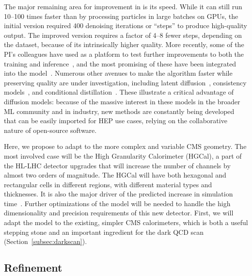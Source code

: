 The major remaining area for improvement in \diffu is its speed.
While it can still run 10--100 times faster than \GEANTfour by processing particles in large batches on GPUs,
the initial version required 400 denoising iterations or ``steps'' to produce high-quality output.
The improved version requires a factor of 4--8 fewer steps, depending on the dataset, because of its intrinsically higher quality.
More recently, some of the PI's colleagues have used \diffu as a platform to test further improvements to both the training and inference~\cite{Jiang:2024ohg},
and the most promising of these have been integrated into the model~\cite{Amram:GitHub}.
Numerous other avenues to make the algorithm faster while preserving quality are under investigation,
including latent diffusion~\cite{Rombach:2022}, consistency models~\cite{Song:2023}, and conditional distillation~\cite{Mei:2023}.
These illustrate a critical advantage of diffusion models:
because of the massive interest in these models in the broader ML community and in industry,
new methods are constantly being developed that can be easily imported for HEP use cases,
relying on the collaborative nature of open-source software.

Here, we propose to adapt \diffu to the more complex and variable CMS geometry.
The most involved case will be the High Granularity Calorimeter (HGCal), a part of the HL-LHC detector upgrades
that will increase the number of channels by almost two orders of magnitude.
The HGCal will have both hexagonal and rectangular cells in different regions, with different material types and thicknesses.
It is also the major driver of the predicted increase in \GEANTfour simulation time~\cite{Pedro:2020kbk}.
Further optimizations of the \diffu model will be needed to handle the high dimensionality and precision requirements of this new detector.
First, we will adapt the model to the existing, simpler CMS calorimeters,
which is both a useful stepping stone and an important ingredient for the dark QCD scan (Section~\ref{subsec:darkscan}).

\subsection{Refinement}\label{subsec:refine}

